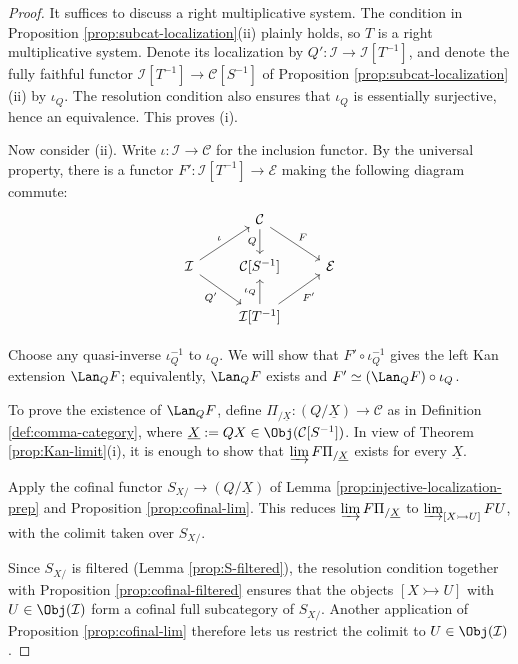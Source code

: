 \begin{proof}
	It suffices to discuss a right multiplicative system. The condition in
	Proposition \ref{prop:subcat-localization}(ii) plainly holds, so $T$ is a
	right multiplicative system. Denote its localization by
	$Q':\mathcal{I}\to\mathcal{I}[T^{-1}]$, and denote the fully faithful
	functor $\mathcal{I}[T^{-1}]\to\mathcal{C}[S^{-1}]$ of Proposition
	\ref{prop:subcat-localization}(ii) by $\iota_Q$. The resolution condition
	also ensures that $\iota_Q$ is essentially surjective, hence an
	equivalence. This proves (i).

	Now consider (ii). Write $\iota:\mathcal{I}\to\mathcal{C}$ for the
	inclusion functor. By the universal property, there is a functor
	$F':\mathcal{I}[T^{-1}]\to\mathcal{E}$ making the following diagram
	commute:
	\[\begin{tikzcd}
		& \mathcal{C} \arrow[d, "Q"'] \arrow[rd, "F"] & \\
		\mathcal{I} \arrow[ru, "\iota"] \arrow[rd, "{Q'}"'] & {\mathcal{C}[S^{-1}]} & \mathcal{E} \\
		& {\mathcal{I}[T^{-1}]} \arrow[u, "\iota_Q"] \arrow[ru, "{F'}"'] &
	\end{tikzcd}\]

	Choose any quasi-inverse $\iota_Q^{-1}$ to $\iota_Q$. We will show that
	$F'\circ\iota_Q^{-1}$ gives the left Kan extension $\Lan_QF$; equivalently,
	$\Lan_QF$ exists and $F'\simeq(\Lan_QF)\circ\iota_Q$.

	To prove the existence of $\Lan_QF$, define
	$\Pi_{/\underline{X}}:(Q/\underline{X})\to\mathcal{C}$ as in Definition
	\ref{def:comma-category}, where
	$\underline{X}:=QX\in\Obj(\mathcal{C}[S^{-1}])$. In view of Theorem
	\ref{prop:Kan-limit}(i), it is enough to show that
	$\varinjlim F\Pi_{/\underline{X}}$ exists for every $\underline{X}$.

	Apply the cofinal functor $S_{X/}\to(Q/\underline{X})$ of Lemma
	\ref{prop:injective-localization-prep} and Proposition
	\ref{prop:cofinal-lim}. This reduces
	$\varinjlim F\Pi_{/\underline{X}}$ to
	$\varinjlim_{[X\rightarrowtail U]}FU$, with the colimit taken over
	$S_{X/}$.

	Since $S_{X/}$ is filtered (Lemma \ref{prop:S-filtered}), the resolution
	condition together with Proposition \ref{prop:cofinal-filtered} ensures
	that the objects $[X\rightarrowtail U]$ with
	$U\in\Obj(\mathcal{I})$ form a cofinal full subcategory of $S_{X/}$.
	Another application of Proposition \ref{prop:cofinal-lim} therefore lets
	us restrict the colimit to $U\in\Obj(\mathcal{I})$.


\end{proof}
